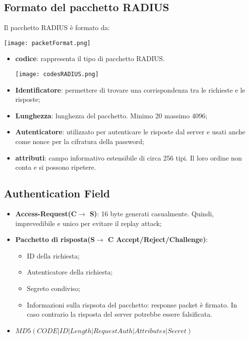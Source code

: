 \documentclass{article}
\theoremstyle{remark}
\begin{document}
\subsection{Formato del pacchetto RADIUS}
Il pacchetto RADIUS è formato da:\begin{center}
    \texttt{[image: packetFormat.png]}
\end{center}\begin{itemize}
    \item \textbf{codice}: rappresenta il tipo di pacchetto RADIUS.\begin{center}
        \texttt{[image: codesRADIUS.png]}
    \end{center}
    \item \textbf{Identificatore}: permettere di trovare una corrispondenza tra le richieste e le risposte;
    \item \textbf{Lunghezza}: lunghezza del pacchetto. Minimo 20 massimo 4096;
    \item \textbf{Autenticatore}: utilizzato per autenticare le risposte dal server e usati anche come nonce per la cifratura della password;
    \item \textbf{attributi}: campo informativo estensibile di circa 256 tipi. Il loro ordine non conta e si possono ripetere.
\end{itemize}
\subsection{Authentication Field}
\begin{itemize}
    \item \textbf{Access-Request(C$\rightarrow$ S)}: 16 byte generati casualmente. Quindi, imprevedibile e unico per evitare il replay attack;
    \item \textbf{Pacchetto di risposta(S$\rightarrow$ C Accept/Reject/Challenge)}:\begin{itemize}
        \item ID della richiesta;
        \item Autenticatore della richiesta;
        \item Segreto condiviso;
        \item Informazioni sulla rispsota del pacchetto: response packet è firmato. In caso contrario la risposta del server potrebbe essere falsificata.
    \end{itemize}
    \item $MD5(CODE|ID|Length|RequestAuth|Attributes|Secret)$
\end{itemize}
\end{document}
